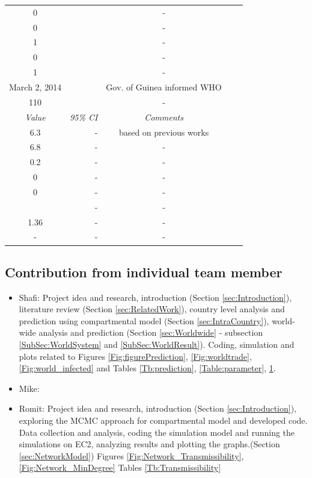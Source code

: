 \documentclass[10pt, journal,onecolumn]{IEEEtran}
\begin{document}
\begin{appendix}
\begin{table}[h]
{\begin{tabular}{@{}crccc@{}}
 0& & -\\
 0& & -\\
 1& & -\\
 0& & -\\
 1& &-\\
 March 2, 2014 &  & Gov. of Guinea informed WHO\\
110 & & -\\
\midrule
 \textit{Value} & \textit{95\% CI} & \textit{Comments} \\
\midrule
6.3 & - & based on previous works \cite{}\\
6.8 & - & -\\
0.2 & - & -\\
0 & - & -\\
0 & - & -\\
 & - & -\\
1.36 &- &-\\
- & - &-\\
\end{tabular}
}
\label{Table:parameter2}
\end{table}


\end{appendix}

\subsection*{Contribution from individual team member}
\begin{itemize}
\item{Shafi: } Project idea and research, introduction (Section \ref{sec:Introduction}), literature review (Section \ref{sec:RelatedWork}), country level analysis and prediction using compartmental model (Section \ref{sec:IntraCountry}), world-wide analysis and prediction (Section \ref{sec:Worldwide} - subsection \ref{SubSec:WorldSystem} and \ref{SubSec:WorldResult}). Coding, simulation and plots related to Figures \ref{Fig:figurePrediction}, \ref{Fig:worldtrade}, \ref{Fig:world_infected} and Tables \ref{Tb:prediction}, \ref{Table:parameter}, \ref{Table:parameter2}.

\item{Mike: } 

\item {Romit: } Project idea and research, introduction (Section \ref{sec:Introduction}), exploring the MCMC approach for compartmental model  and developed code.
Data collection and analysis, coding the simulation model and running the simulations on EC2, analyzing results and plotting the graphs.(Section \ref{sec:NetworkModel})
Figures \ref{Fig:Network_Transmissibility}, \ref{Fig:Network_MinDegree}
Tables \ref{Tb:Transmissibility}
\end{itemize}
\end{document}
